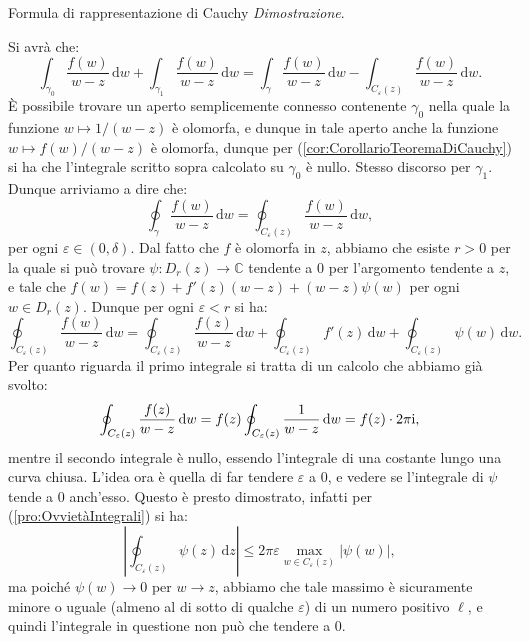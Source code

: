 \documentclass[11pt]{book}
\makeatletter
\theoremstyle{Definizione}
\theoremstyle{TeoremaProposizioneLemmaCorollarioCongettura}
\theoremstyle{OsservazioneNotaEsempio}
\renewenvironment{proof}[1][\proofname]{\par
  \normalfont \topsep6\p@\@plus6\p@\relax
  \trivlist
  \item[\hskip\labelsep
        \itshape
    #1\@addpunct{.}]\ignorespaces
}{%
  \endtrivlist\@endpefalse
}
\renewenvironment{proof}{\textsl{Dimostrazione}.}{}
\newcommand{\C}{\mathbb{C}}
\newcommand{\Disc}[3][]{D^{#1}_{{#2}}({#3})}
\renewcommand{\i}{\textup{i}}
\renewcommand{\d}{\mathrm{d}}
\newcommand{\dz}{\,\d z}
\newcommand{\dw}{\,\d w}
\newcommand{\frecciaIn}{
\tikz \draw[-latex] (-1pt,0) -- (1pt,0);
}
\newcommand{\frecciaOut}{
\tikz \draw[latex-] (-1pt,0) -- (1pt,0);
}
\makeatother
\begin{document}
\begin{boxteo}{Formula di rappresentazione di Cauchy}
\begin{proof}
\begin{center}
\end{center} 
Si avrà che:
$$
\int_{\gamma_0} \frac{f(w)}{w-z}\dw + \int_{\gamma_1} \frac{f(w)}{w-z}\dw = \int_{\gamma} \frac{f(w)}{w-z}\dw - \int_{C_\varepsilon(z)} \frac{f(w)}{w-z}\dw.
$$
È possibile trovare un aperto semplicemente connesso contenente $\gamma_0$ nella quale la funzione $w \longmapsto 1/(w-z)$ è olomorfa, e dunque in tale aperto anche la funzione $w \longmapsto f(w)/(w-z)$ è olomorfa, dunque per (\ref{cor:CorollarioTeoremaDiCauchy}) si ha che l'integrale scritto sopra calcolato su $\gamma_0$ è nullo. Stesso discorso per $\gamma_1$. Dunque arriviamo a dire che:
$$
\oint_{\gamma} \frac{f(w)}{w-z}\dw = \oint_{C_{\varepsilon}(z)} \frac{f(w)}{w-z}\dw,
$$
per ogni $\varepsilon \in (0,\delta)$. Dal fatto che $f$ è olomorfa in $z$, abbiamo che esiste $r > 0$ per la quale si può trovare $\psi:\Disc{r}{z}\longrightarrow \C$ tendente a $0$ per l'argomento tendente a $z$, e tale che $f(w) = f(z)+f'(z)(w-z) + (w-z)\psi(w)$ per ogni $w\in \Disc{r}{z}$. Dunque per ogni $\varepsilon < r$ si ha:
$$
\oint_{C_\varepsilon(z)} \frac{f(w)}{w-z}\dw = \oint_{C_\varepsilon(z)} \frac{f(z)}{w-z} \dw + \oint_{C_\varepsilon(z)} f'(z) \dw + \oint_{C_\varepsilon(z)} \psi(w)\dw.
$$
Per quanto riguarda il primo integrale si tratta di un calcolo che abbiamo già svolto:
$$
\oint_{C_\varepsilon(z)} \frac{f(z)}{w-z}\dw = f(z) \oint_{C_\varepsilon(z)} \frac{1}{w-z}\dw = f(z)\cdot 2\pi\i,
$$
mentre il secondo integrale è nullo, essendo l'integrale di una costante lungo una curva chiusa. L'idea ora è quella di far tendere $\varepsilon$ a $0$, e vedere se l'integrale di $\psi$ tende a $0$ anch'esso. Questo è presto dimostrato, infatti per (\ref{pro:OvvietàIntegrali}) si ha:
$$
\left|\oint_{C_\varepsilon(z)} \psi(z)\dz\right|\leq 2\pi \varepsilon \max_{w\in C_{\varepsilon}(z)} |\psi(w)|,
$$
ma poiché $\psi(w) \to 0$ per $w \to z$, abbiamo che tale massimo è sicuramente minore o uguale (almeno al di sotto di qualche $\varepsilon$) di un numero positivo $\ell$, e quindi l'integrale in questione non può che tendere a $0$.
\end{proof}
\end{boxteo}
\end{document}
